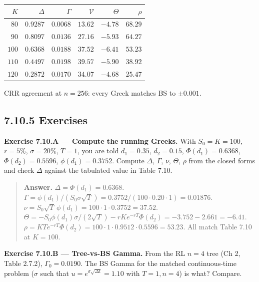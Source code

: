 \documentclass[
  10pt,
  twoside]{book}
\newcounter{none} %
\begin{document}
{\def\LTcaptype{none} %
\begin{table}[H]
\centering
\begin{tabular}{|r|r|r|r|r|r|}
\toprule
\(K\) & \(\Delta\) & \(\Gamma\) & \(\mathcal V\) & \(\Theta\) &
\(\rho\) \\
\midrule



\(80\) & \(0.9287\) & \(0.0068\) & \(13.62\) & \(-4.78\) & \(68.29\) \\
\(90\) & \(0.8097\) & \(0.0136\) & \(27.16\) & \(-5.93\) & \(64.27\) \\
\(100\) & \(0.6368\) & \(0.0188\) & \(37.52\) & \(-6.41\) & \(53.23\) \\
\(110\) & \(0.4497\) & \(0.0198\) & \(39.57\) & \(-5.90\) & \(38.92\) \\
\(120\) & \(0.2872\) & \(0.0170\) & \(34.07\) & \(-4.68\) & \(25.47\) \\
\bottomrule
\end{tabular}
\end{table}
}

CRR agreement at \(n=256\): every Greek matches BS to \(\pm 0.001\).

\subsection{7.10.5 Exercises}\label{exercises-39}

\textbf{Exercise 7.10.A --- Compute the running Greeks.} With
\(S_0=K=100\), \(r=5\%\), \(\sigma=20\%\), \(T=1\), you are told
\(d_1=0.35\), \(d_2=0.15\), \(\Phi(d_1)=0.6368\), \(\Phi(d_2)=0.5596\),
\(\phi(d_1)=0.3752\). Compute \(\Delta\), \(\Gamma\), \(\nu\),
\(\Theta\), \(\rho\) from the closed forms and check \(\Delta\) against
the tabulated value in Table 7.10.

\begin{quote}
\textbf{Answer.} \(\Delta=\Phi(d_1)=\mathbf{0.6368}\).
\(\Gamma=\phi(d_1)/(S_0\sigma\sqrt T)=0.3752/(100\cdot 0.20\cdot 1)=\mathbf{0.01876}\).
\(\nu=S_0\sqrt T\,\phi(d_1)=100\cdot 1\cdot 0.3752=\mathbf{37.52}\).
\(\Theta=-S_0\phi(d_1)\sigma/(2\sqrt T)-rKe^{-rT}\Phi(d_2)=-3.752-2.661=\mathbf{-6.41}\).
\(\rho=KTe^{-rT}\Phi(d_2)=100\cdot 1\cdot 0.9512\cdot 0.5596=\mathbf{53.23}\).
All match Table 7.10 at \(K=100\).
\end{quote}

\textbf{Exercise 7.10.B --- Tree-vs-BS Gamma.} From the RL \(n=4\) tree
(Ch 2, Table 2.7.2), \(\Gamma_0=0.0190\). The BS Gamma for the matched
continuous-time problem (\(\sigma\) such that
\(u=e^{\sigma\sqrt{\Delta t}}=1.10\) with \(T=1, n=4\)) is what?
Compare.
\end{document}
